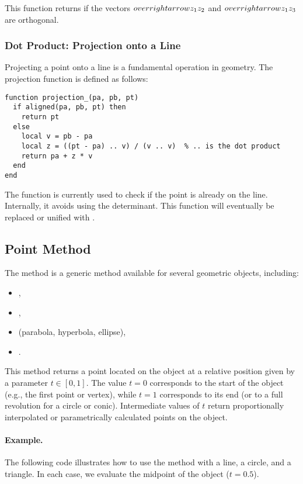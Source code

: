 This function returns  if the vectors \( \\overrightarrow{z_1z_2} \) and \( \\overrightarrow{z_1z_3} \) are orthogonal.

\subsubsection{Dot Product: Projection onto a Line}
Projecting a point onto a line is a fundamental operation in geometry. The projection function is defined as follows:

\begin{verbatim}
function projection_(pa, pb, pt)
  if aligned(pa, pb, pt) then
    return pt
  else
    local v = pb - pa
    local z = ((pt - pa) .. v) / (v .. v)  % .. is the dot product
    return pa + z * v
  end
end
\end{verbatim}

The function  is currently used to check if the point is already on the line. Internally, it avoids using the determinant. This function will eventually be replaced or unified with .

\subsection{Point Method}

The  method is a generic method available for several geometric objects, including:

\begin{itemize}
  \item {},
  \item {},
  \item {} (parabola, hyperbola, ellipse),
  \item {}.
\end{itemize}

This method returns a point located on the object at a relative position given by a parameter \( t \in [0,1] \). The value \( t = 0 \) corresponds to the start of the object (e.g., the first point or vertex), while \( t = 1 \) corresponds to its end (or to a full revolution for a circle or conic). Intermediate values of \( t \) return proportionally interpolated or parametrically calculated points on the object.

\paragraph{Example.}
The following code illustrates how to use the  method with a line, a circle, and a triangle. In each case, we evaluate the midpoint of the object (\( t = 0.5 \)).

